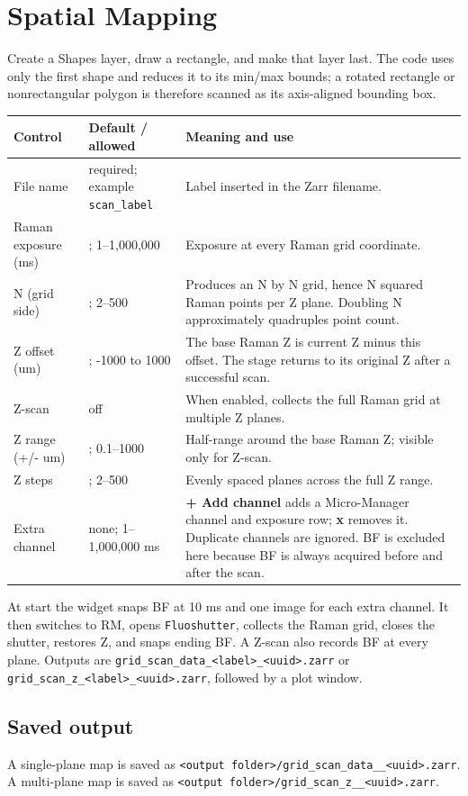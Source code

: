 \documentclass[11pt,oneside]{report}
\makeatletter
\newcommand{\ui}[1]{\textbf{#1}}
\newcommand{\code}[1]{\texttt{#1}}
\newcommand{\fieldtable}{\begin{longtable}{@{}>{\raggedright\arraybackslash}p{0.25\textwidth}>{\raggedright\arraybackslash}p{0.18\textwidth}>{\raggedright\arraybackslash}p{0.50\textwidth}@{}}\toprule\textbf{Control} & \textbf{Default / allowed} & \textbf{Meaning and use}\\\midrule\endhead}
\newcommand{\endfieldtable}{\bottomrule\end{longtable}}
\makeatother
\begin{document}
\chapter{Spatial Mapping}

Create a Shapes layer, draw a rectangle, and make that layer last. The code uses
only the first shape and reduces it to its min/max bounds; a rotated rectangle or
nonrectangular polygon is therefore scanned as its axis-aligned bounding box.

\fieldtable
File name & required; example \code{scan\_label} & Label inserted in the Zarr filename.\\
Raman exposure (ms) & 1000; 1--1,000,000 & Exposure at every Raman grid coordinate.\\
N (grid side) & 20; 2--500 & Produces an N by N grid, hence N squared Raman points
per Z plane. Doubling N approximately quadruples point count.\\
Z offset (um) & 4; -1000 to 1000 & The base Raman Z is current Z minus this
offset. The stage returns to its original Z after a successful scan.\\
Z-scan & off & When enabled, collects the full Raman grid at multiple Z planes.\\
Z range (+/- um) & 5; 0.1--1000 & Half-range around the base Raman Z; visible only
for Z-scan.\\
Z steps & 10; 2--500 & Evenly spaced planes across the full Z range.\\
Extra channel & none; 1--1,000,000 ms & \ui{+ Add channel} adds a Micro-Manager
channel and exposure row; \ui{x} removes it. Duplicate channels are ignored. BF is
excluded here because BF is always acquired before and after the scan.\\
\endfieldtable

At start the widget snaps BF at 10 ms and one image for each extra channel. It then
switches to RM, opens \code{Fluoshutter}, collects the Raman grid, closes the shutter,
restores Z, and snaps ending BF. A Z-scan also records BF at every plane. Outputs are
\code{grid\_scan\_data\_<label>\_<uuid>.zarr} or
\code{grid\_scan\_z\_<label>\_<uuid>.zarr}, followed by a plot window.

\section*{Saved output}
A single-plane map is saved as
\code{<output folder>/grid\_scan\_data\_<File name>\_<uuid>.zarr}. A multi-plane
map is saved as
\code{<output folder>/grid\_scan\_z\_<File name>\_<uuid>.zarr}.
\end{document}
